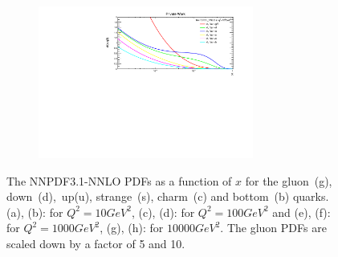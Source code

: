 \begin{figure}[H]
\begin{subfigure}{0.45\textwidth}
\vspace*{-8mm}
\caption{}
\end{subfigure}
\begin{subfigure}{0.45\textwidth}
\includegraphics[height=5cm, width=\textwidth]{chapter4/xfx10000gev1.pdf}
\vspace*{-8mm}
\caption{}
\end{subfigure}
\caption{The NNPDF3.1-NNLO PDFs as a function of $x$ for the gluon~(g), down~(d),~up(u), strange~(s), charm~(c) and bottom~(b) quarks. (a), (b): for $Q^{2}= 10GeV^{2}$, (c), (d): for $Q^{2}=100GeV^{2}$ and (e), (f): for $Q^{2}=1000GeV^{2}$, (g), (h): for $10000GeV^{2}$. The gluon PDFs are scaled down by a factor of 5 and 10.} 
\label{nnpdf_nnlo}
\end{figure}

